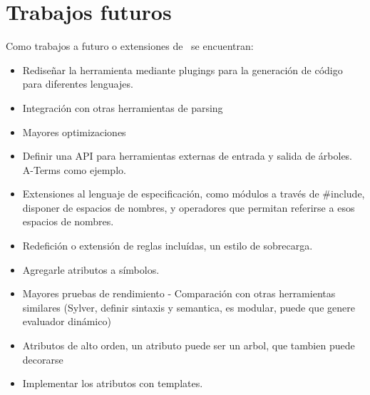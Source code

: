 \section{Trabajos futuros}
Como trabajos a futuro o extensiones de \maggen\ se encuentran:
\begin{itemize}
\item Rediseñar la herramienta mediante plugings para la generación de código para diferentes lenguajes.
\item Integración con otras herramientas de parsing
\item Mayores optimizaciones
\item Definir una API para herramientas externas de entrada y salida de árboles. A-Terms como ejemplo.
\item Extensiones al lenguaje de especificación, como módulos a través de \#include, disponer de espacios de nombres, y operadores que permitan referirse a esos espacios de nombres.
\item Redefición o extensión de reglas incluídas, un estilo de sobrecarga.
\item Agregarle atributos a símbolos.
\item Mayores pruebas de rendimiento
        - Comparación con otras herramientas similares (Sylver, definir sintaxis y semantica, es modular, puede que genere evaluador dinámico)
\item Atributos de alto orden, un atributo puede ser un arbol, que tambien puede decorarse
\item Implementar los atributos con templates.

\end{itemize}